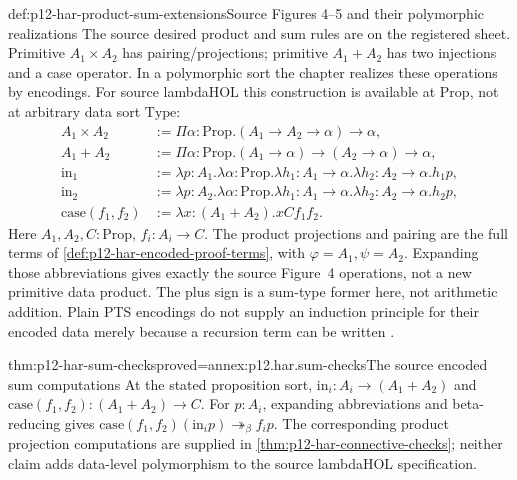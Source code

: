 \begin{hbdefinition}{def:p12-har-product-sum-extensions}{Source Figures 4--5 and their polymorphic realizations}
The source desired product and sum rules are on the registered sheet.
Primitive \(A_1\times A_2\) has pairing/projections; primitive
\(A_1+A_2\) has two injections and a case operator. In a polymorphic
sort the chapter realizes these operations by encodings. For source
lambdaHOL this construction is available at \(\mathrm{Prop}\), not
at arbitrary data sort \(\mathrm{Type}\):
\[
\begin{aligned}
 A_1\times A_2&:=\Pi\alpha:\mathrm{Prop}.
                  (A_1\to A_2\to\alpha)\to\alpha,\\
 A_1+A_2&:=\Pi\alpha:\mathrm{Prop}.
                  (A_1\to\alpha)\to(A_2\to\alpha)\to\alpha,\\
 \mathrm{in}_1&:=\lambda p:A_1.\lambda\alpha:\mathrm{Prop}.
     \lambda h_1:A_1\to\alpha.\lambda h_2:A_2\to\alpha.h_1p,\\
 \mathrm{in}_2&:=\lambda p:A_2.\lambda\alpha:\mathrm{Prop}.
     \lambda h_1:A_1\to\alpha.\lambda h_2:A_2\to\alpha.h_2p,\\
 \mathrm{case}(f_1,f_2)&:=\lambda x:(A_1+A_2).x C f_1f_2.
\end{aligned}
\]
Here \(A_1,A_2,C:\mathrm{Prop}\), \(f_i:A_i\to C\).
The product projections and pairing are the full terms of
\cref{def:p12-har-encoded-proof-terms}, with
\(\varphi=A_1,\psi=A_2\). Expanding those abbreviations gives
exactly the source Figure~4 operations, not a new primitive data product.
The plus sign is a sum-type former here, not arithmetic addition.
Plain PTS encodings do not supply an induction principle for their
encoded data merely because a recursion term can be written
\cite[pp.~1202--1204, Figs.~4--5]{BarendregtGeuvers2001}.
\end{hbdefinition}

\begin{hbtheorem}{thm:p12-har-sum-checks}{proved=annex:p12.har.sum-checks}{The source encoded sum computations}
At the stated proposition sort,
\(\mathrm{in}_i:A_i\to(A_1+A_2)\) and
\(\mathrm{case}(f_1,f_2):(A_1+A_2)\to C\).
For \(p:A_i\), expanding abbreviations and beta-reducing gives
\(\mathrm{case}(f_1,f_2)(\mathrm{in}_i p)
\twoheadrightarrow_\beta f_i p\). The corresponding product
projection computations are supplied in
\cref{thm:p12-har-connective-checks}; neither claim adds data-level
polymorphism to the source lambdaHOL specification.
\end{hbtheorem}

